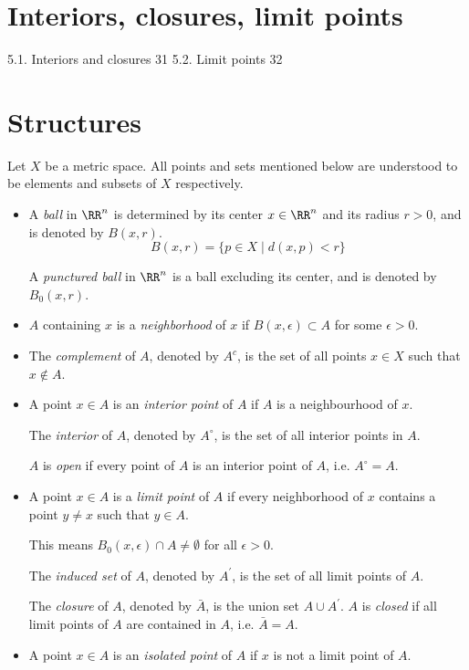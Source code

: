 \section{Interiors, closures, limit points}
5.1. Interiors and closures 31
5.2. Limit points 32

\section{Structures}
Let $X$ be a metric space. All points and sets mentioned below are understood to be elements and subsets of $X$ respectively.
\begin{itemize}
\item A \emph{ball} in $\RR^n$ is determined by its center $x\in\RR^n$ and its radius $r>0$, and is denoted by $B(x,r)$.
\[ B(x,r) = \{p \in X \mid d(x,p) < r\} \]

A \emph{punctured ball} in $\RR^n$ is a ball excluding its center, and is denoted by $B_0(x,r)$.

\item $A$ containing $x$ is a \emph{neighborhood} of $x$ if $B(x,\epsilon) \subset A$ for some $\epsilon>0$.

\item The \emph{complement} of $A$, denoted by $A^c$, is the set of all points $x \in X$ such that $x \notin A$.

\item A point $x \in A$ is an \emph{interior point} of $A$ if $A$ is a neighbourhood of $x$.

The \emph{interior} of $A$, denoted by $A^\circ$, is the set of all interior points in $A$.

$A$ is \emph{open} if every point of $A$ is an interior point of $A$, i.e. $A^\circ=A$.

\item A point $x\in A$ is a \emph{limit point} of $A$ if every neighborhood of $x$ contains a point $y \neq x$ such that $y \in A$.

This means $B_0(x,\epsilon) \cap A \neq \emptyset$ for all $\epsilon>0$.

The \emph{induced set} of $A$, denoted by $A^\prime$, is the set of all limit points of $A$.

The \emph{closure} of $A$, denoted by $\bar{A}$, is the union set $A\cup A^\prime$. $A$ is \emph{closed} if all limit points of $A$ are contained in $A$, i.e. $\bar{A}=A$.

\item A point $x \in A$ is an \emph{isolated point} of $A$ if $x$ is not a limit point of $A$.


\end{itemize}
